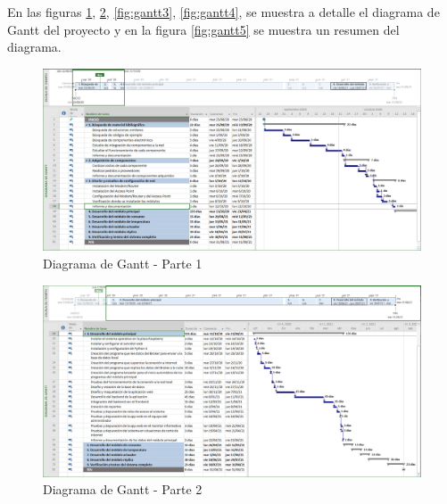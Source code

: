 \documentclass[11pt]{charter}
\begin{document}
En las figuras \ref{fig:gantt1}, \ref{fig:gantt2}, \ref{fig:gantt3}, \ref{fig:gantt4}, se muestra a detalle el diagrama de Gantt del proyecto y en la figura \ref{fig:gantt5} se muestra un resumen del diagrama.
\begin{landscape} %
\begin{figure}[htpb]
\centering 
\includegraphics[width=1.5\textwidth]{./Figuras/gantt01.png}
\caption{Diagrama de Gantt - Parte 1}
\label{fig:gantt1}
\end{figure}
\end{landscape} %
\begin{landscape} %
\begin{figure}[htpb]
\centering 
\includegraphics[width=1.5\textwidth]{./Figuras/gantt02.png}
\caption{Diagrama de Gantt - Parte 2}
\label{fig:gantt2}
\end{figure}
\end{landscape} %
\end{document}
